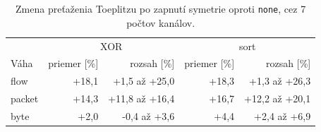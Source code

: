 \begin{table}[ht]
  \centering
  \small
  \caption{Zmena preťaženia Toeplitzu po zapnutí symetrie oproti \texttt{none}, cez 7 počtov kanálov.}
  \label{tab:symetria}
  \begin{tabular}{l rr rr}
    \toprule
    & \multicolumn{2}{c}{XOR} & \multicolumn{2}{c}{sort} \\
    Váha & priemer [\%] & rozsah [\%] & priemer [\%] & rozsah [\%] \\
    \midrule
    flow & +18,1 & +1,5 až +25,0 & +18,3 & +1,3 až +26,3 \\
    packet & +14,3 & +11,8 až +16,4 & +16,7 & +12,2 až +20,1 \\
    byte & +2,0 & -0,4 až +3,6 & +4,4 & +2,4 až +6,9 \\
    \bottomrule
  \end{tabular}
\end{table}
